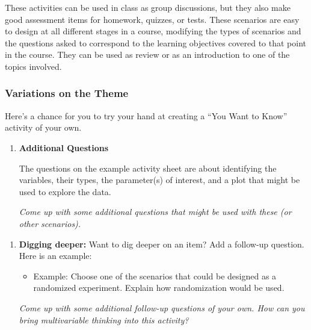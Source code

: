 \documentclass[]{article}
\providecommand{\tightlist}{%
  \setlength{\itemsep}{0pt}\setlength{\parskip}{0pt}}
\begin{document}
These activities can be used in class as group discussions, but they
also make good assessment items for homework, quizzes, or tests. These
scenarios are easy to design at all different stages in a course,
modifying the types of scenarios and the questions asked to correspond
to the learning objectives covered to that point in the course. They can
be used as review or as an introduction to one of the topics involved.

\hypertarget{variations-on-the-theme}{%
\subsubsection{Variations on the Theme}\label{variations-on-the-theme}}

Here's a chance for you to try your hand at creating a ``You Want to
Know'' activity of your own.

\begin{enumerate}
\def\labelenumi{\arabic{enumi}.}
\item
  \textbf{Additional Questions}

  The questions on the example activity sheet are about identifying the
  variables, their types, the parameter(s) of interest, and a plot that
  might be used to explore the data.

  \emph{Come up with some additional questions that might be used with
  these (or other scenarios).}
\end{enumerate}

\begin{enumerate}
\def\labelenumi{\arabic{enumi}.}
\setcounter{enumi}{1}
\item
  \textbf{Digging deeper:} Want to dig deeper on an item? Add a
  follow-up question. Here is an example:

  \begin{itemize}
  \tightlist
  \item
    Example: Choose one of the scenarios that could be designed as a
    randomized experiment. Explain how randomization would be used.
  \end{itemize}

  \emph{Come up with some additional follow-up questions of your own.
  How can you bring multivariable thinking into this activity?}
\end{enumerate}
\end{document}
